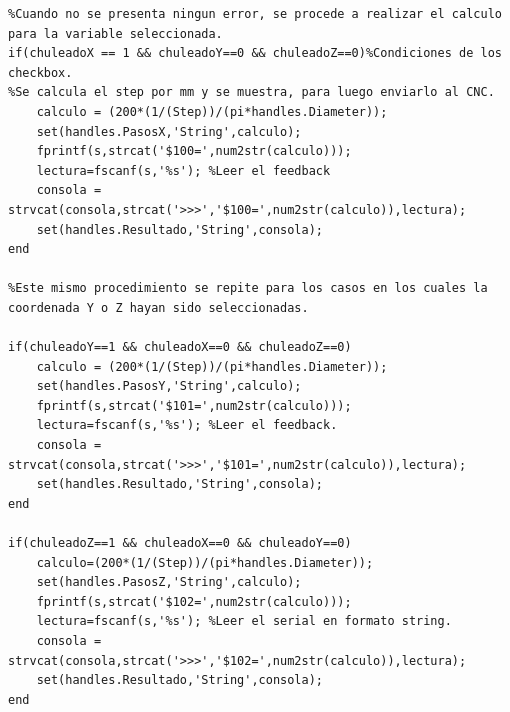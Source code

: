 \documentclass{article}
\begin{document}
\begin{multicols}{2}
\begin{itemize}
\begin{lstlisting}
%Cuando no se presenta ningun error, se procede a realizar el calculo para la variable seleccionada.
if(chuleadoX == 1 && chuleadoY==0 && chuleadoZ==0)%Condiciones de los checkbox.
%Se calcula el step por mm y se muestra, para luego enviarlo al CNC.
    calculo = (200*(1/(Step))/(pi*handles.Diameter));
    set(handles.PasosX,'String',calculo);
    fprintf(s,strcat('$100=',num2str(calculo)));
    lectura=fscanf(s,'%s'); %Leer el feedback
    consola = strvcat(consola,strcat('>>>','$100=',num2str(calculo)),lectura);
    set(handles.Resultado,'String',consola);
end

%Este mismo procedimiento se repite para los casos en los cuales la coordenada Y o Z hayan sido seleccionadas.

if(chuleadoY==1 && chuleadoX==0 && chuleadoZ==0)
    calculo = (200*(1/(Step))/(pi*handles.Diameter));
    set(handles.PasosY,'String',calculo);
    fprintf(s,strcat('$101=',num2str(calculo)));
    lectura=fscanf(s,'%s'); %Leer el feedback.
    consola = strvcat(consola,strcat('>>>','$101=',num2str(calculo)),lectura);
    set(handles.Resultado,'String',consola);
end

if(chuleadoZ==1 && chuleadoX==0 && chuleadoY==0)
    calculo=(200*(1/(Step))/(pi*handles.Diameter));
    set(handles.PasosZ,'String',calculo);
    fprintf(s,strcat('$102=',num2str(calculo)));
    lectura=fscanf(s,'%s'); %Leer el serial en formato string.
    consola = strvcat(consola,strcat('>>>','$102=',num2str(calculo)),lectura);
    set(handles.Resultado,'String',consola);
end


\end{lstlisting}
\end{itemize}
\end{multicols}
\end{document}
